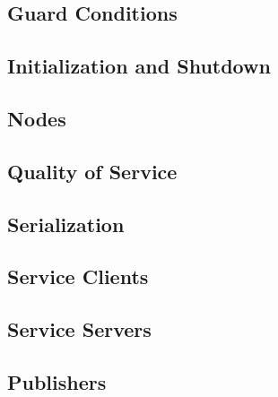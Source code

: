         

    \subsection{Guard Conditions}

        

    \subsection{Initialization and Shutdown}

        

    \subsection{Nodes}

        

    \subsection{Quality of Service}

        

    \subsection{Serialization}

        

    \subsection{Service Clients}

        

    \subsection{Service Servers}

        

    \subsection{Publishers}

